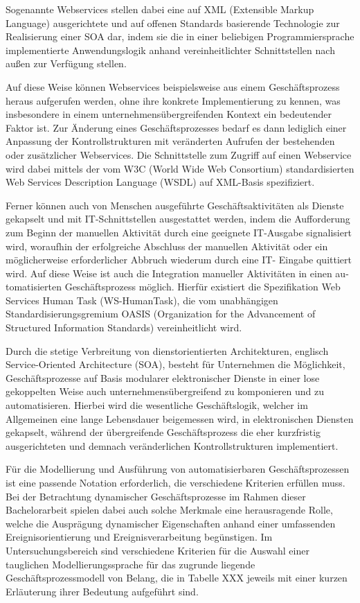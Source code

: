 Sogenannte Webservices stellen dabei eine auf XML (Extensible Markup Language) ausgerichtete und auf offenen Standards basierende Technologie zur Realisierung einer SOA dar, indem sie die in einer beliebigen Programmiersprache implementierte Anwendungslogik anhand vereinheitlichter Schnittstellen nach außen zur Verfügung stellen. 

Auf diese Weise können Webservices beispielsweise aus einem Geschäftsprozess heraus aufgerufen werden, ohne ihre konkrete Implementierung zu kennen, was insbesondere in einem unternehmensübergreifenden Kontext ein bedeutender Faktor ist. 
Zur Änderung eines Geschäftsprozesses bedarf es dann lediglich einer Anpassung der Kontrollstrukturen mit veränderten Aufrufen der bestehenden oder zusätzlicher Webservices. 
Die Schnittstelle zum Zugriff auf einen Webservice wird dabei mittels der vom W3C (World Wide Web Consortium) standardisierten Web Services Description Language (WSDL) auf XML-Basis spezifiziert.

Ferner können auch von Menschen ausgeführte Geschäftsaktivitäten als Dienste gekapselt und mit IT-Schnittstellen ausgestattet werden, indem die Aufforderung zum Beginn der manuellen Aktivität durch eine geeignete IT-Ausgabe signalisiert wird, woraufhin der erfolgreiche Abschluss der manuellen Aktivität oder ein möglicherweise erforderlicher Abbruch wiederum durch eine IT- Eingabe quittiert wird. 
Auf diese Weise ist auch die Integration manueller Aktivitäten in einen au- tomatisierten Geschäftsprozess möglich. 
Hierfür existiert die Spezifikation Web Services Human Task (WS-HumanTask), die vom unabhängigen Standardisierungsgremium OASIS (Organization for the Advancement of Structured Information Standards) vereinheitlicht wird.

Durch die stetige Verbreitung von dienstorientierten Architekturen, englisch Service-Oriented Architecture (SOA), besteht für Unternehmen die Möglichkeit, Geschäftsprozesse auf Basis modularer elektronischer Dienste in einer lose gekoppelten Weise auch unternehmensübergreifend zu komponieren und zu automatisieren. 
Hierbei wird die wesentliche Geschäftslogik, welcher im Allgemeinen eine lange Lebensdauer beigemessen wird, in elektronischen Diensten gekapselt, während der übergreifende Geschäftsprozess die eher kurzfristig ausgerichteten und demnach veränderlichen Kontrollstrukturen implementiert.

Für die Modellierung und Ausführung von automatisierbaren Geschäftsprozessen ist eine passende Notation erforderlich, die verschiedene Kriterien erfüllen muss.
Bei der Betrachtung dynamischer Geschäftsprozesse im Rahmen dieser Bachelorarbeit spielen dabei auch solche Merkmale eine herausragende Rolle, welche die Ausprägung dynamischer Eigenschaften anhand einer umfassenden Ereignisorientierung und Ereignisverarbeitung begünstigen.
Im Untersuchungsbereich sind verschiedene Kriterien für die Auswahl einer tauglichen Modellierungssprache für das zugrunde liegende Geschäftsprozessmodell von Belang, die in Tabelle XXX jeweils mit einer kurzen Erläuterung ihrer Bedeutung aufgeführt sind.

